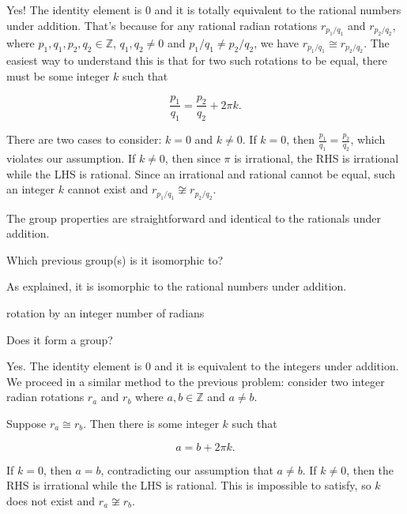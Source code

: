 \documentclass[../key.tex]{subfiles}
\begin{document}
\noindent Yes! The identity element is $0$ and it is totally equivalent to the rational numbers under addition. That's because for any rational radian rotations $r_{p_1/q_1}$ and $r_{p_2/q_2}$, where $p_1,q_1,p_2,q_2\in \mathbb{Z}$, $q_1,q_2\neq 0$ and $p_1/q_1\neq p_2/q_2$, we have $r_{p_1/q_1}\cong r_{p_2/q_2}$. The easiest way to understand this is that for two such rotations to be equal, there must be some integer $k$ such that

$$\frac{p_1}{q_1} = \frac{p_2}{q_2} + 2\pi k.$$

\noindent There are two cases to consider: $k=0$ and $k\neq 0$. If $k=0$, then $\frac{p_1}{q_1} = \frac{p_2}{q_2}$, which violates our assumption. If $k\neq 0$, then since $\pi$ is irrational, the RHS is irrational while the LHS is rational. Since an irrational and rational cannot be equal, such an integer $k$ cannot exist and $r_{p_1/q_1}\not\cong r_{p_2/q_2}$.

The group properties are straightforward and identical to the rationals under addition.

\begin{iinner_problem}
\item Which previous group(s) is it isomorphic to?
\end{iinner_problem}

\noindent As explained, it is isomorphic to the rational numbers under addition.

\begin{inner_problem}
\item rotation by an integer number of radians
\end{inner_problem}

\begin{iinner_problem}[start=1]
\item Does it form a group?
\end{iinner_problem}

\noindent Yes. The identity element is $0$ and it is equivalent to the integers under addition. We proceed in a similar method to the previous problem: consider two integer radian rotations $r_a$ and $r_b$ where $a,b\in \mathbb{Z}$ and $a\neq b$.

Suppose $r_a\cong r_b$. Then there is some integer $k$ such that

$$a=b+2\pi k.$$

\noindent If $k=0$, then $a=b$, contradicting our assumption that $a\neq b$. If $k\neq 0$, then the RHS is irrational while the LHS is rational. This is impossible to satisfy, so $k$ does not exist and $r_a\not\cong r_b$.
\end{document}
